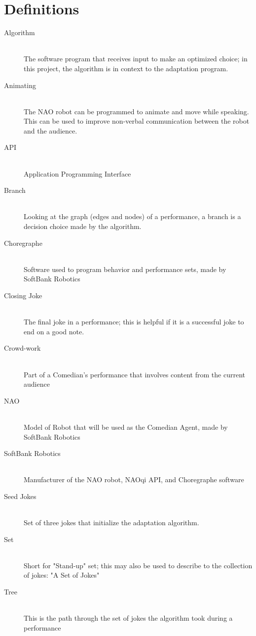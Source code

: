 \documentclass[onecolumn, draftclsnofoot,10pt, compsoc]{IEEEtran}
\begin{document}
\section{Definitions}
\begin{description}
  \item [Algorithm] \hfill \\ The software program that receives input to make an optimized choice; in this project, the algorithm is in context to the adaptation program.
	\item [Animating] \hfill \\ The NAO robot can be programmed to animate and move while speaking. This can be used to improve non-verbal communication between the robot and the audience.
  \item [API] \hfill \\ Application Programming Interface
  \item [Branch] \hfill \\Looking at the graph (edges and nodes) of a performance, a branch is a decision choice made by the algorithm.
  \item [Choregraphe] \hfill \\ Software used to program behavior and performance sets, made by SoftBank Robotics
  \item [Closing Joke] \hfill \\The final joke in a performance; this is helpful if it is a successful joke to end on a good note.
  \item [Crowd-work] \hfill \\ Part of a Comedian's performance that involves content from the current audience
  \item [NAO] \hfill \\ Model of Robot that will be used as the Comedian Agent, made by SoftBank Robotics
  \item [SoftBank Robotics] \hfill \\ Manufacturer of the NAO robot, NAOqi API, and Choregraphe software
  \item [Seed Jokes] \hfill \\ Set of three jokes that initialize the adaptation algorithm.
  \item [Set] \hfill \\Short for "Stand-up" set; this may also be used to describe to the collection of jokes: "A Set of Jokes"
  \item [Tree] \hfill \\This is the path through the set of jokes the algorithm took during a performance

\end{description}



\end{document}
